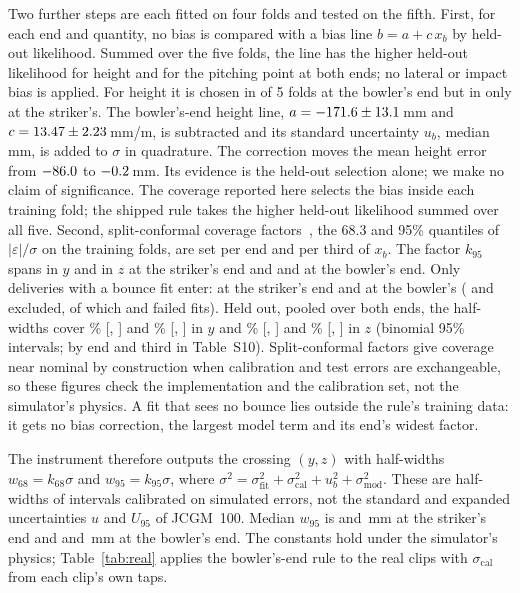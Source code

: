 \documentclass[journal]{IEEEtran}
\begin{document}
Two further steps are each fitted on four folds and tested on the fifth. First, for each end and quantity,
no bias is compared with a bias line $b = a + c\,x_b$ by held-out likelihood. Summed over the five folds, the line has the
higher held-out likelihood for height and for the pitching point at both ends; no lateral or impact bias is applied. For height it is chosen in
\CalBowlerZBiasFolds{} of 5 folds at the bowler's end but in only \CalStrikerZBiasFolds{} at the striker's.
The bowler's-end height line, $a = -171.6 \pm 13.1$\,mm
and $c = 13.47 \pm 2.23$\,mm/m, is subtracted and its standard uncertainty $u_b$,
median \CalBowlerZBiasMedU\,mm, is added to $\sigma$ in quadrature. The correction moves the mean height error from
$-86.0$ to $-0.2$\,mm. Its evidence is the held-out selection alone; we make no
claim of significance. The coverage reported here selects the bias inside each training fold; the shipped rule takes the
higher held-out likelihood summed over all five. Second, split-conformal coverage factors~\cite{vovk2005alrw,angelopoulos2023gentle},
the 68.3 and 95\% quantiles of $|\varepsilon|/\sigma$ on the training folds, are set per end and per third
of $x_b$. The factor $k_{95}$ spans \CalStrikerYKNinetyfive{} in $y$ and \CalStrikerZKNinetyfive{} in $z$ at the
striker's end and \CalBowlerYKNinetyfive{} and \CalBowlerZKNinetyfive{} at the bowler's end. Only
deliveries with a bounce fit enter: \CalStrikerYN{} at the striker's end and \CalBowlerYN{} at the bowler's
(\CalStrikerExcluded{} and \CalBowlerExcluded{} excluded, of which \DenStrikerNotFitted{} and \DenBowlerNotFitted{} failed fits). Held out, pooled over both ends, the half-widths
cover \CalYCovSixtyeight\% [\CalYCovSixtyeightLo, \CalYCovSixtyeightHi] and
\CalYCovNinetyfive\% [\CalYCovNinetyfiveLo, \CalYCovNinetyfiveHi] in $y$ and \CalZCovSixtyeight\%
[\CalZCovSixtyeightLo, \CalZCovSixtyeightHi] and \CalZCovNinetyfive\% [\CalZCovNinetyfiveLo,
\CalZCovNinetyfiveHi] in $z$ (binomial 95\% intervals; by end and third in Table~S10). Split-conformal
factors give coverage near nominal by construction when calibration and test errors are exchangeable, so
these figures check the implementation and the calibration set, not the simulator's physics. A fit that sees no
bounce lies outside the rule's training data: it gets no bias correction, the largest model term and its end's widest factor.

The instrument therefore outputs the crossing $(y, z)$ with half-widths $w_{68} = k_{68}\sigma$ and
$w_{95} = k_{95}\sigma$, where $\sigma^2 = \sigma_\mathrm{fit}^2 + \sigma_\mathrm{cal}^2 + u_b^2 +
\sigma_\mathrm{mod}^2$. These are half-widths of intervals calibrated on simulated errors, not the
standard and expanded uncertainties $u$ and $U_{95}$ of JCGM~100. Median $w_{95}$ is
\CalStrikerYMedUNinetyfive{} and \CalStrikerZMedUNinetyfive\,mm at the striker's end and
\CalBowlerYMedUNinetyfive{} and \CalBowlerZMedUNinetyfive\,mm at the bowler's end. The constants hold under
the simulator's physics; Table~\ref{tab:real} applies the bowler's-end rule to the real clips with
$\sigma_\mathrm{cal}$ from each clip's own taps.
\end{document}
